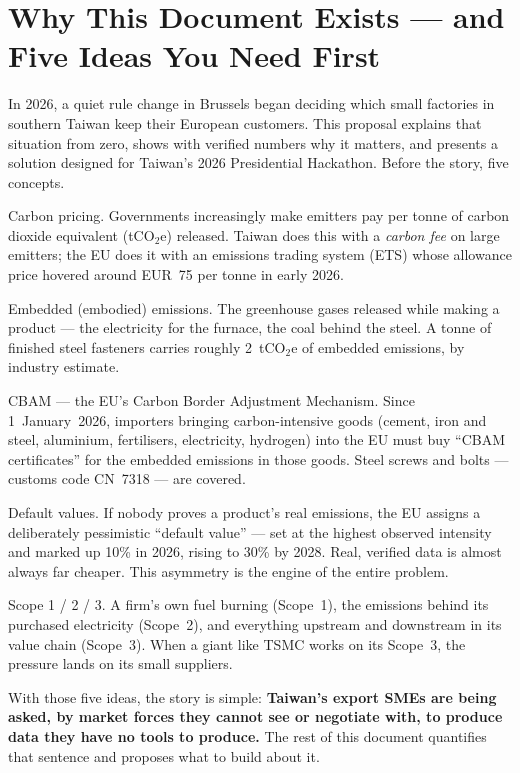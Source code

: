 \section{Why This Document Exists --- and Five Ideas You Need First}\label{sec:intro}

In 2026, a quiet rule change in Brussels began deciding which small factories in
southern Taiwan keep their European customers. This proposal explains that
situation from zero, shows with verified numbers why it matters, and presents a
solution designed for Taiwan's 2026 Presidential Hackathon. Before the story,
five concepts.

\begin{concept}{Carbon pricing.}
Governments increasingly make emitters pay per tonne of carbon dioxide
equivalent (tCO$_2$e) released. Taiwan does this with a \emph{carbon fee} on
large emitters; the EU does it with an emissions trading system (ETS) whose
allowance price hovered around EUR~75 per tonne in early 2026\cite{ecprice}.
\end{concept}

\begin{concept}{Embedded (embodied) emissions.}
The greenhouse gases released while making a product --- the electricity for
the furnace, the coal behind the steel. A tonne of finished steel fasteners
carries roughly 2~tCO$_2$e of embedded emissions, by industry
estimate\cite{specialinsert}.
\end{concept}

\begin{concept}{CBAM --- the EU's Carbon Border Adjustment Mechanism.}
Since 1~January~2026, importers bringing carbon-intensive goods (cement, iron
and steel, aluminium, fertilisers, electricity, hydrogen) into the EU must buy
``CBAM certificates'' for the embedded emissions in those goods\cite{taxud}.
Steel screws and bolts --- customs code CN~7318 --- are covered\cite{carbonchain}.
\end{concept}

\begin{concept}{Default values.}
If nobody proves a product's real emissions, the EU assigns a deliberately
pessimistic ``default value'' --- set at the highest observed intensity and
marked up 10\% in 2026, rising to 30\% by 2028\cite{omm,bpc}. Real, verified
data is almost always far cheaper. This asymmetry is the engine of the entire
problem.
\end{concept}

\begin{concept}{Scope 1 / 2 / 3.}
A firm's own fuel burning (Scope~1), the emissions behind its purchased
electricity (Scope~2), and everything upstream and downstream in its value
chain (Scope~3). When a giant like TSMC works on its Scope~3, the pressure
lands on its small suppliers\cite{tsmc}.
\end{concept}

With those five ideas, the story is simple: \textbf{Taiwan's export SMEs are
being asked, by market forces they cannot see or negotiate with, to produce
data they have no tools to produce.} The rest of this document quantifies that
sentence and proposes what to build about it.
